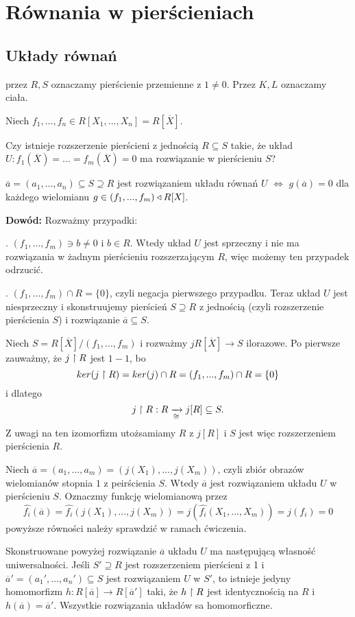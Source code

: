 \section{Równania w pierścieniach}

\subsection{Układy równań}

 przez $R, S$ oznaczamy pierścienie przemienne z $1\neq0$. Przez $K, L$ oznaczamy ciała.

Niech $f_1,...,f_n\in R[X_1,..., X_n]=R[\overline X]$.

 Czy istnieje rozszerzenie pierścieni z jednością $R\subseteq S$ takie, że układ $U:f_1(\overline X)=...=f_m(\overline X)=0$ ma rozwiązanie w pierścieniu $S$?

$\overline a=(a_1,...,a_n)\subseteq S\supseteq R$ jest rozwiązaniem układu równań $U$ $\iff$ $g(\overline a)=0$ dla każdego wielomianu $g\in(f_1,...,f_m)\triangleleft R[X]$.

\textbf{Dowód:} Rozważmy przypadki:

. $(f_1,...,f_m)\ni b\neq 0$ i $b\in R$. Wtedy układ $U$ jest sprzeczny i nie ma rozwiązania w żadnym pierścieniu rozszerzającym $R$, więc możemy ten przypadek odrzucić.

. $(f_1,...,f_m)\cap R=\{0\}$, czyli negacja pierwszego przypadku. Teraz układ $U$ jest niesprzeczny i skonstruujemy pierścień $S\supseteq R$ z jednością (czyli rozszerzenie pierścienia $S$) i rozwiązanie $\overline a\subseteq S$.

Niech $S=R[\overline X]/(f_1,...,f_m)$ i rozważmy $jR[\overline X]\to S$ ilorazowe. Po pierwsze zauważmy, że $j\upharpoonright R$ jest $1-1$, bo
$$ker(j\upharpoonright R)=ker(j)\cap R=(f_1,...,f_m)\cap R=\{0\}$$
i dlatego 
$$j\upharpoonright R:R\xrightarrow[\cong]{} j[R]\subseteq S.$$
Z uwagi na ten izomorfizm utożsamiamy $R$ z $j[R]$ i $S$ jest więc rozszerzeniem pierścienia $R$.

Niech $\overline a=(a_1,...,a_m)=(j(X_1),...,j(X_m))$, czyli zbiór obrazów wielomianów stopnia $1$ z peirścienia $S$. Wtedy $\overline a$ jest rozwiązaniem układu $U$ w pierścieniu $S$. Oznaczmy funkcję wielomianową przez
$$\hat{f_i}(\overline a)=\hat{f_i}(j(X_1),...,j(X_m))=j(\hat{f_i}(X_1,...,X_m))=j(f_i)=0$$
powyższe równości należy sprawdzić w ramach ćwiczenia.

 Skonstruowane powyżej rozwiązanie $\overline a$ układu $U$ ma następującą własność uniwersalności. Jeśli $S'\supseteq R$ jest rozszerzeniem pierścieni z 1 i $\overline a'=(a_1',...,a_n')\subseteq S$ jest rozwiązaniem $U$ w $S'$, to istnieje jedyny homomorfizm $h:R[\overline a]\to R[\overline a']$ taki, że $h\upharpoonright R$ jest identycznością na $R$ i $h(\overline a)=\overline a'$. Wszystkie rozwiązania układów sa homomorficzne.


